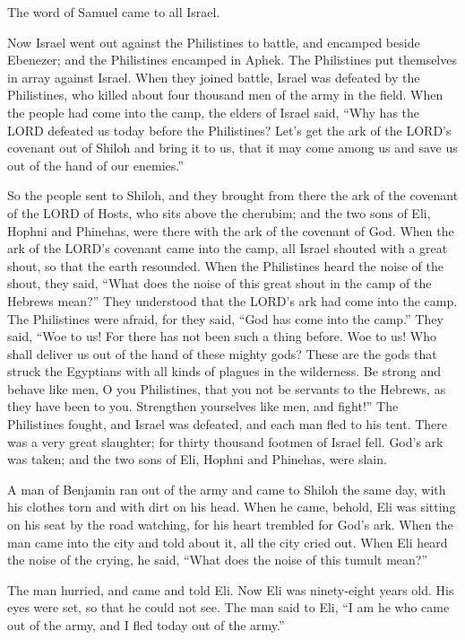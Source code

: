 \mychapter{}\myverse*{}The word of Samuel came to all Israel.

Now Israel went out against the Philistines to battle, and encamped beside Ebenezer; and
the Philistines encamped in Aphek.
\myverse{}The Philistines put themselves in array against Israel. When they joined battle,
Israel was defeated by the Philistines, who killed about four thousand men of the army in the field.
\myverse{}When the people had come into the camp, the elders of Israel said, “Why has
the LORD defeated us today before the Philistines? Let’s get the ark of the LORD’s covenant out of Shiloh
and bring it to us, that it may come among us and save us out of the hand of our enemies.”

\myverse{}So the people sent to Shiloh, and they brought from there the ark
of the covenant of the LORD of Hosts, who sits above the cherubim; and the two sons of Eli, Hophni and
Phinehas, were there with the ark of the covenant of God.
\myverse{}When the ark of the LORD’s covenant came into the camp, all Israel shouted with
a great shout, so that the earth resounded.
\myverse{}When the Philistines heard the noise of the shout, they said, “What does the
noise of this great shout in the camp of the Hebrews mean?” They understood that the LORD’s ark had come
into the camp.
\myverse{}The Philistines were afraid, for they said, “God has come into the camp.” They
said, “Woe to us! For there has not been such a thing before.
\myverse{}Woe to us! Who shall deliver us out of the hand of these mighty gods? These
are the gods that struck the Egyptians with all kinds of plagues in the wilderness.
\myverse{}Be strong and behave like men, O you Philistines, that you not be servants to
the Hebrews, as they have been to you. Strengthen yourselves like men, and fight!”
\myverse{}The Philistines fought, and Israel was defeated, and each man fled to his
tent. There was a very great slaughter; for thirty thousand footmen of Israel fell.
\myverse{}God’s ark was taken; and the two sons of Eli, Hophni and Phinehas, were slain.

\myverse{}A man of Benjamin ran out of the army and came to Shiloh the
same day, with his clothes torn and with dirt on his head.
\myverse{}When he came, behold, Eli was sitting on his seat by the road watching, for
his heart trembled for God’s ark. When the man came into the city and told about it, all the city cried
out.
\myverse{}When Eli heard the noise of the crying, he said, “What does the noise of this
tumult mean?”

The man hurried, and came and told Eli.
\myverse{}Now Eli was ninety-eight years old. His eyes were set, so that he could not
see.
\myverse{}The man said to Eli, “I am he who came out of the army, and I fled today out
of the army.”

